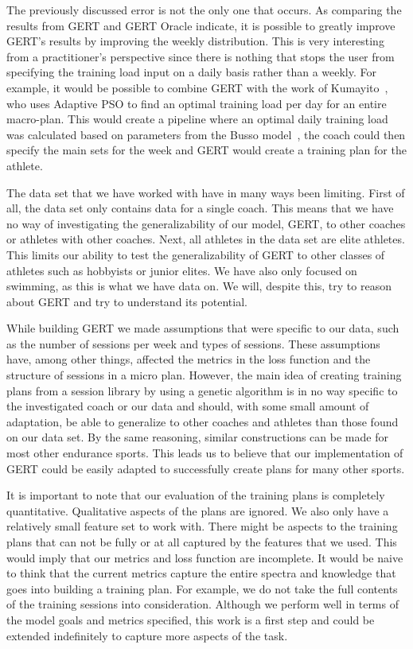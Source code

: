 The previously discussed error is not the only one that occurs.
As comparing the results from GERT and GERT Oracle indicate, it is possible to greatly improve GERT's results by improving the weekly distribution.
This is very interesting from a practitioner's perspective since there is nothing that stops the user from specifying the training load input on a daily basis rather than a weekly.
For example, it would be possible to combine GERT with the work of Kumayito~\cite{kumyaito2018planning}, who uses Adaptive PSO to find an optimal training load per day for an entire macro-plan.
This would create a pipeline where an optimal daily training load was calculated based on parameters from the Busso model~\cite{busso2006using}, the coach could then specify the main sets for the week and GERT would create a training plan for the athlete.

The data set that we have worked with have in many ways been limiting.
First of all, the data set only contains data for a single coach.
This means that we have no way of investigating the generalizability of our model, GERT, to other coaches or athletes with other coaches.
Next, all athletes in the data set are elite athletes.
This limits our ability to test the generalizability of GERT to other classes of athletes such as hobbyists or junior elites.
We have also only focused on swimming, as this is what we have data on.
We will, despite this, try to reason about GERT and try to understand its potential.

While building GERT we made assumptions that were specific to our data, such as the number of sessions per week and types of sessions.
These assumptions have, among other things, affected the metrics in the loss function and the structure of sessions in a micro plan.
However, the main idea of creating training plans from a session library by using a genetic algorithm is in no way specific to the investigated coach or our data and should, with some small amount of adaptation, be able to generalize to other coaches and athletes than those found on our data set. 
By the same reasoning, similar constructions can be made for most other endurance sports.
This leads us to believe that our implementation of GERT could be easily adapted to successfully create plans for many other sports. 

It is important to note that our evaluation of the training plans is completely quantitative.
Qualitative aspects of the plans are ignored.
We also only have a relatively small feature set to work with.
There might be aspects to the training plans that can not be fully or at all captured by the features that we used.
This would imply that our metrics and loss function are incomplete.
It would be naive to think that the current metrics capture the entire spectra and knowledge that goes into building a training plan.
For example, we do not take the full contents of the training sessions into consideration.
Although we perform well in terms of the model goals and metrics specified, this work is a first step and could be extended indefinitely to capture more aspects of the task.
